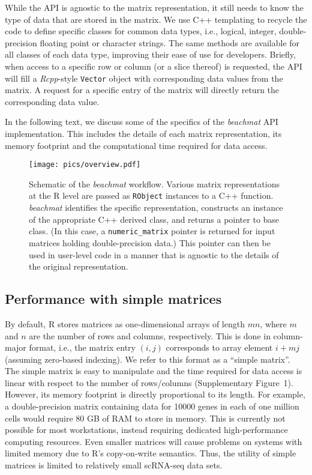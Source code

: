 \documentclass[10pt,letterpaper]{article}
\newcommand{\beachmat}{\textit{beachmat}}
\newcommand{\code}[1]{\texttt{#1}}
\newcommand{\suppfigsimpleaccess}{1}
\begin{document}
While the API is agnostic to the matrix representation, it still needs to know the type of data that are stored in the matrix.
We use C++ templating to recycle the code to define specific classes for common data types, i.e., logical, integer, double-precision floating point or character strings.
The same methods are available for all classes of each data type, improving their ease of use for developers.
Briefly, when access to a specific row or column (or a slice thereof) is requested, the API will fill a \textit{Rcpp}-style \code{Vector} object with corresponding data values from the matrix.
A request for a specific entry of the matrix will directly return the corresponding data value.

In the following text, we discuss some of the specifics of the \beachmat{} API implementation.
This includes the details of each matrix representation, its memory footprint and the computational time required for data access.

\begin{figure}[btp]
    \begin{center}
        \texttt{[image: pics/overview.pdf]}
    \end{center}
    \caption{Schematic of the \beachmat{} workflow.
        Various matrix representations at the R level are passed as \code{RObject} instances to a C++ function.
        \beachmat{} identifies the specific representation, constructs an instance of the appropriate C++ derived class, and returns a pointer to base class.
        (In this case, a \code{numeric\_matrix} pointer is returned for input matrices holding double-precision data.)
        This pointer can then be used in user-level code in a manner that is agnostic to the details of the original representation.
    }
    \label{fig:beachoverview}
\end{figure}

\subsection*{Performance with simple matrices}
By default, R stores matrices as one-dimensional arrays of length $mn$, where $m$ and $n$ are the number of rows and columns, respectively.
This is done in column-major format, i.e., the matrix entry $(i, j)$ corresponds to array element $i + mj$ (assuming zero-based indexing).
We refer to this format as a ``simple matrix''.
The simple matrix is easy to manipulate and the time required for data access is linear with respect to the number of rows/columns (Supplementary Figure~\suppfigsimpleaccess{}).
However, its memory footprint is directly proportional to its length.
For example, a double-precision matrix containing data for 10000 genes in each of one million cells would require 80 GB of RAM to store in memory.
This is currently not possible for most workstations, instead requiring dedicated high-performance computing resources.
Even smaller matrices will cause problems on systems with limited memory due to R's copy-on-write semantics.
Thus, the utility of simple matrices is limited to relatively small scRNA-seq data sets.
\end{document}
